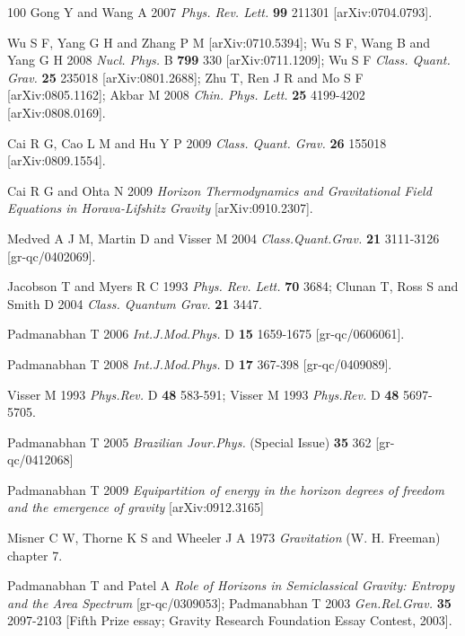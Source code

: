 \documentclass[12pt]{iopart}
\begin{document}
\begin{thebibliography}{100}
Gong Y and Wang A 2007 \textit{Phys. Rev. Lett.} {\bf 99} 211301   [arXiv:0704.0793].

Wu S F, Yang G H and Zhang P M  [arXiv:0710.5394];
Wu S F, Wang B and Yang G H 2008 \textit{Nucl. Phys.}  B {\bf 799} 330 [arXiv:0711.1209];
Wu S F  \textit{Class. Quant. Grav.} \textbf{25} 235018 [arXiv:0801.2688];
Zhu T, Ren J R and Mo S F   [arXiv:0805.1162];
Akbar M  2008 \textit{Chin. Phys. Lett.} \textbf{25}  4199-4202 [arXiv:0808.0169].
 
Cai R G, Cao L M and Hu Y P 2009 \textit{Class. Quant. Grav.} {\bf 26} 155018 [arXiv:0809.1554].

Cai R G and Ohta  N  2009 \textit{Horizon Thermodynamics and Gravitational Field Equations in Horava-Lifshitz Gravity} [arXiv:0910.2307].


Medved  A J M, Martin D and  Visser M  2004 \textit{Class.Quant.Grav.} \textbf{21}   3111-3126 [gr-qc/0402069]. 
  

Jacobson T and Myers R C  1993 \textit{Phys. Rev. Lett.} {\bf 70} 3684; 
Clunan T, Ross S and  Smith  D  2004 \textit{Class. Quantum Grav.} \textbf{21} 3447.

Padmanabhan T  2006 \textit{Int.J.Mod.Phys.} D \textbf{15} 1659-1675 [gr-qc/0606061].

Padmanabhan  T  2008 \textit{Int.J.Mod.Phys.} D \textbf{17}  367-398  [gr-qc/0409089].

Visser M  1993  \textit{Phys.Rev.} D \textbf{48}  583-591; 
Visser M  1993  \textit{Phys.Rev.} D \textbf{48}  5697-5705.

Padmanabhan T  2005 \textit{Brazilian Jour.Phys.} (Special Issue) \textbf{35} 362 [gr-qc/0412068] 

Padmanabhan T 2009  \textit{Equipartition of energy in the horizon degrees of freedom and the emergence of gravity} [arXiv:0912.3165]

Misner C W, Thorne K S and Wheeler J A 1973 \textit{Gravitation} (W. H. Freeman) chapter 7.

Padmanabhan T and Patel A 
       \textit{Role of Horizons in Semiclassical Gravity: Entropy and the Area Spectrum} [gr-qc/0309053];
Padmanabhan T  2003 \textit{Gen.Rel.Grav.} \textbf{35} 2097-2103
       [Fifth Prize essay; Gravity Research Foundation Essay Contest, 2003].


\end{thebibliography}
\end{document}
